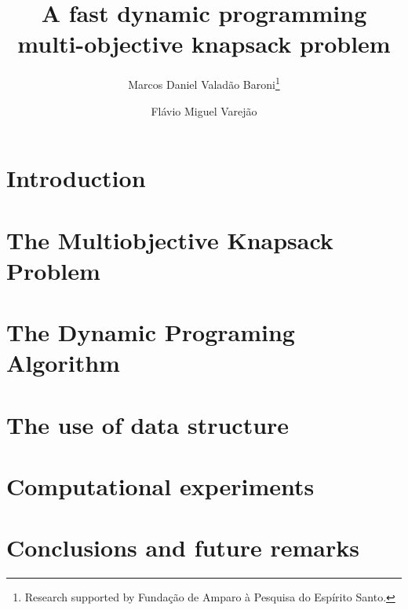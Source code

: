 \documentclass{article}
\begin{document}
\title{A fast dynamic programming multi-objective knapsack problem}

\author{
   Marcos Daniel Valad\~ao Baroni\thanks{Research supported by Funda\c c\~ao de Amparo \`a Pesquisa do Esp\'irito Santo.}
   \and
   Fl\'avio Miguel Varej\~ao
}





\maketitle

\begin{abstract}

\end{abstract}

\section{Introduction}
\label{sec:intro}


\section{The Multiobjective Knapsack Problem}
\label{sec:mokp}


\section{The Dynamic Programing Algorithm}
\label{sec:progdyn}


\section{The use of data structure}
\label{sec:kdtree}


\section{Computational experiments}
\label{sec:exp}


\section{Conclusions and future remarks}
\label{sec:conc}




\end{document}
